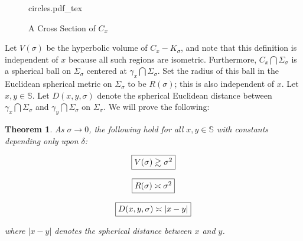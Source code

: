 \documentclass[11pt]{article}
\newtheorem{tm}{Theorem}[section]
\newcommand{\incfig}[1]{%
    \def\svgwidth{.6\textwidth}
    {#1.pdf_tex}
}
\newcommand\sph{{\mathbb{S}}}
\begin{document}
\bigskip

\begin{figure}[ht]
    \centering
    \incfig{circles}
    \caption{A Cross Section of $C_x$}
    \label{fig:circles}
\end{figure}

 Let $V(\sigma)$ be the hyperbolic volume of $C_x - K_\sigma$, and note that this definition is independent of $x$ because all such regions are isometric. Furthermore, $C_x \bigcap \Sigma_\sigma$ is a spherical ball on $\Sigma_\sigma$ centered at $\gamma_x \bigcap \Sigma_\sigma$. Set the radius of this ball in the Euclidean spherical metric on $\Sigma_\sigma$ to be $R(\sigma)$; this is also independent of $x$. Let $x, y \in \sph$. Let $D(x,y,\sigma)$ denote the spherical Euclidean  distance between $\gamma_x \bigcap \Sigma_\sigma$  and $\gamma_y \bigcap \Sigma_\sigma$ on $\Sigma_\sigma$. We will prove the following:

 \begin{tm}
     As $\sigma \rightarrow 0$, the following hold for all $x,y \in \sph$ with constants depending only upon $\delta$:

    \begin{equation}
        \fbox{$V(\sigma) \gtrsim \sigma^2$}
    \end{equation}

    \begin{equation}
        \fbox{$R(\sigma) \asymp \sigma^2$}
    \end{equation}

    \begin{equation}
        \fbox{$D(x,y,\sigma) \asymp |x-y|$}
    \end{equation}

    where $|x-y|$ denotes the spherical distance between $x$ and $y$. 
    
 \end{tm}

 \bigskip
\end{document}
